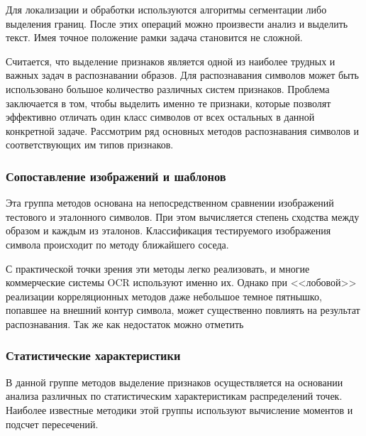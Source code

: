 Для локализации и обработки используются алгоритмы сегментации либо выделения границ. После этих операций можно произвести анализ и выделить текст. Имея точное положение рамки задача становится не сложной.

Считается, что выделение признаков является одной из наиболее трудных и важных задач в распознавании образов. Для распознавания символов может быть использовано большое количество различных систем признаков. Проблема заключается в том, чтобы выделить именно те признаки, которые позволят эффективно отличать один класс символов от всех остальных в данной конкретной задаче.
Рассмотрим ряд основных методов распознавания символов и соответствующих им типов признаков.

\subsubsection{Сопоставление изображений и шаблонов}
\label{sub:domain:recognition:compare_with_template}

Эта группа методов основана на непосредственном сравнении изображений тестового и эталонного символов. При этом вычисляется степень сходства между образом и каждым из эталонов. Классификация тестируемого изображения символа происходит по методу ближайшего соседа. 

С практической точки зрения эти методы легко реализовать, и многие коммерческие системы OCR используют именно их. Однако при <<лобовой>> реализации корреляционных методов даже небольшое темное пятнышко, попавшее на внешний контур символа, может существенно повлиять на результат распознавания. Так же как недостаток можно отметить

\subsubsection{Статистические характеристики}
\label{sub:domain:recognition:statistic_analisys}

В данной группе методов выделение признаков осуществляется на основании анализа различных по статистическим характеристикам распределений точек. Наиболее известные методики этой группы используют вычисление моментов и подсчет пересечений.

